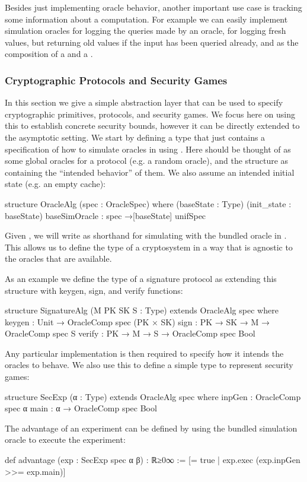 Besides just implementing oracle behavior, another important use case
is tracking some information about a computation.
For example we can easily implement simulation oracles  for logging the queries made by an oracle,  for logging fresh values, but returning old values if the input has been queried already, and  as the composition of a  and a .

\subsubsection{Cryptographic Protocols and Security Games} \label{sec:protocols}
In this section we give a simple abstraction layer that can be used to specify cryptographic primitives, protocols, and security games.
We focus here on using this to establish concrete security bounds, however it can be directly extended to the asymptotic setting.
We start by defining a type  that just contains a specification of how to simulate oracles in  using .
Here  should be thought of as some global oracles for a protocol (e.g. a random oracle), and the structure as containing the ``intended behavior'' of them.
We also assume an intended initial state (e.g. an empty cache):
\begin{leancode}
  structure OracleAlg (spec : OracleSpec) where
   (baseState : Type) (init_state : baseState)
   baseSimOracle : spec →[baseState] unifSpec
\end{leancode}
Given , we will write  as shorthand for simulating  with the bundled oracle in . 
This allows us to define the type of a cryptosystem in a way that is agnostic to the oracles that are available.

As an example we define the type of a signature protocol as extending this structure with keygen, sign, and verify functions:
\begin{leancode}
  structure SignatureAlg (M PK SK S : Type) extends OracleAlg spec where
    keygen : Unit → OracleComp spec (PK × SK)
    sign : PK → SK → M → OracleComp spec S
    verify : PK → M → S → OracleComp spec Bool
\end{leancode}
Any particular implementation is then required to specify how it intends the oracles to behave.
We also use this to define a simple type to represent security games:
\begin{leancode}
  structure SecExp (α : Type) extends OracleAlg spec where
    inpGen : OracleComp spec α
    main : α → OracleComp spec Bool
\end{leancode}
The advantage of an experiment can be defined by using the bundled simulation oracle to execute the experiment:
\begin{leancode}
  def advantage (exp : SecExp spec α β) : ℝ≥0∞ :=
    [= true | exp.exec (exp.inpGen >>= exp.main)]
\end{leancode}

